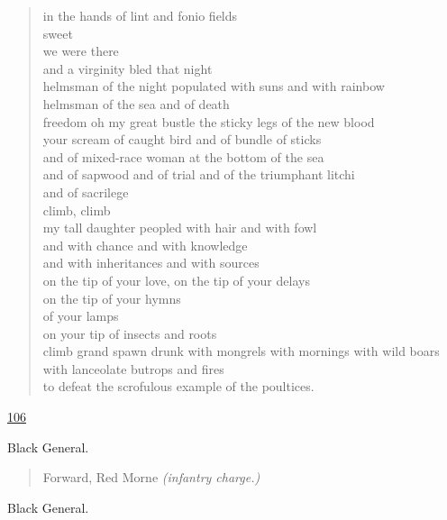 \documentclass[letterpaper,article,12pt,oneside,notitlepage]{memoir}
\begin{document}
\begin{verse}
in the hands of lint and fonio fields \\
sweet \\
we were there \\
and a virginity bled that night \\
helmsman of the night populated with suns and with rainbow \\
helmsman of the sea and of death \\
freedom oh my great bustle the sticky legs of the new blood \\
your scream of caught bird and of bundle of sticks \\
and of mixed-race woman at the bottom of the sea \\
and of sapwood and of trial and of the triumphant litchi \\
and of sacrilege \\
climb, climb \\
my tall daughter peopled with hair and with fowl \\
and with chance and with knowledge \\
and with inheritances and with sources \\
on the tip of your love, on the tip of your delays \\
on the tip of your hymns \\
of your lamps \\
on your tip of insects and roots \\
climb grand spawn drunk with mongrels with mornings with wild boars \\
with lanceolate butrops and fires \\
to defeat the scrofulous example of the poultices. \\
\end{verse}

\clearpage

\href{http://cesaire.elotroalex.com/chiens/chiens/p106.html}{106}

\begin{center}Black General.\end{center}

\begin{verse}
Forward, Red Morne \textit{(infantry charge.)} \\
\end{verse}

\begin{center}Black General.\end{center}
\end{document}
